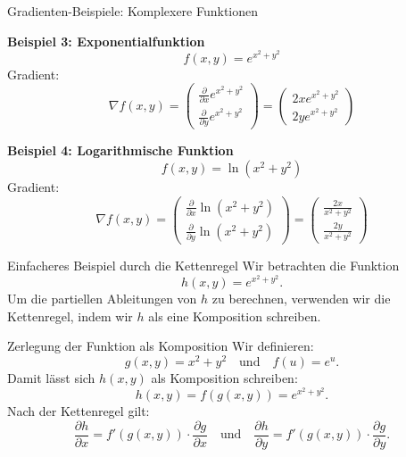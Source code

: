 \documentclass{beamer}
\begin{document}
        \begin{frame}{Gradienten-Beispiele: Komplexere Funktionen}
        
        \textbf{Beispiel 3: Exponentialfunktion}
        \[
        f(x, y) = e^{x^2 + y^2}
        \]
        Gradient:
        \[
        \nabla f(x, y) = 
        \begin{pmatrix}
        \frac{\partial}{\partial x} e^{x^2 + y^2} \\
        \frac{\partial}{\partial y} e^{x^2 + y^2}
        \end{pmatrix}
        = 
        \begin{pmatrix}
        2x e^{x^2 + y^2} \\
        2y e^{x^2 + y^2}
        \end{pmatrix}
        \]
        
        \textbf{Beispiel 4: Logarithmische Funktion}
        \[
        f(x, y) = \ln(x^2 + y^2)
        \]
        Gradient:
        \[
        \nabla f(x, y) = 
        \begin{pmatrix}
        \frac{\partial}{\partial x} \ln(x^2 + y^2) \\
        \frac{\partial}{\partial y} \ln(x^2 + y^2)
        \end{pmatrix}
        = 
        \begin{pmatrix}
        \frac{2x}{x^2 + y^2} \\
        \frac{2y}{x^2 + y^2}
        \end{pmatrix}
        \]
        
        \end{frame}
        
    
    
        \begin{frame}{Einfacheres Beispiel durch die Kettenregel}
            Wir betrachten die Funktion 
            \[
            h(x, y) = e^{x^2 + y^2}.
            \]
            Um die partiellen Ableitungen von \( h \) zu berechnen, verwenden wir die Kettenregel, indem wir \( h \) als eine Komposition schreiben.
        \end{frame}
        
        \begin{frame}{Zerlegung der Funktion als Komposition}
            Wir definieren:
            \[
            g(x, y) = x^2 + y^2 \quad \text{und} \quad f(u) = e^u.
            \]
            Damit lässt sich \( h(x, y) \) als Komposition schreiben:
            \[
            h(x, y) = f(g(x, y)) = e^{x^2 + y^2}.
            \]
            Nach der Kettenregel gilt:
            \[
            \frac{\partial h}{\partial x} = f'(g(x, y)) \cdot \frac{\partial g}{\partial x} \quad \text{und} \quad \frac{\partial h}{\partial y} = f'(g(x, y)) \cdot \frac{\partial g}{\partial y}.
            \]
        \end{frame}
        
\end{document}
